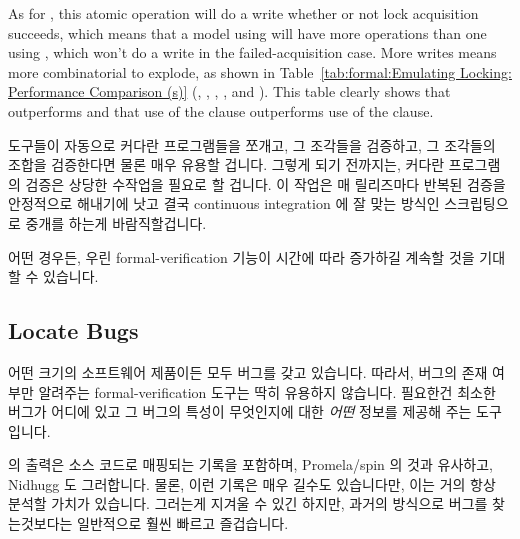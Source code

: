 {	As for , this atomic operation will do a
	write whether or not lock acquisition succeeds, which means
	that a model using  will have more operations
	than one using , which won't do a write
	in the failed-acquisition case.
	More writes means more combinatorial to explode, as shown in
	Table~\ref{tab:formal:Emulating Locking: Performance Comparison (s)}
	(,
	,
	,
	, and
	).
	This table clearly shows that 
	outperforms  and that use of the
	 clause outperforms use of the  clause.
	\fi
} \QuickQuizEnd

도구들이 자동으로 커다란 프로그램들을 쪼개고, 그 조각들을 검증하고, 그 조각들의
조합을 검증한다면 물론 매우 유용할 겁니다.
그렇게 되기 전까지는, 커다란 프로그램의 검증은 상당한 수작업을 필요로 할
겁니다.
이 작업은 매 릴리즈마다 반복된 검증을 안정적으로 해내기에 낫고 결국 continuous
integration 에 잘 맞는 방식인 스크립팅으로 중개를 하는게 바람직할겁니다.

어떤 경우든, 우린 formal-verification 기능이 시간에 따라 증가하길 계속할 것을
기대할 수 있습니다.
\iffalse

It would of course be quite useful for tools to automatically divide
up large programs, verify the pieces, and then verify the combinations
of pieces.
In the meantime, verification of large programs will require significant
manual intervention.
This intervention will preferably mediated by scripting, the better to
reliably carry out repeated verifications on each release, and
preferably eventually in a manner well-suited for continuous integration.

In any case, we can expect formal-verification capabilities to continue
to increase over time.
\fi

\subsection{Locate Bugs}
\label{sec:formal:Locate Bugs}

어떤 크기의 소프트웨어 제품이든 모두 버그를 갖고 있습니다.
따라서, 버그의 존재 여부만 알려주는 formal-verification 도구는 딱히 유용하지
않습니다.
필요한건 최소한 버그가 어디에 있고 그 버그의 특성이 무엇인지에 대한 \emph{어떤}
정보를 제공해 주는 도구입니다.

 의 출력은 소스 코드로 매핑되는 기록을 포함하며, Promela/spin 의 것과
유사하고, Nidhugg 도 그러합니다.
물론, 이런 기록은 매우 길수도 있습니다만, 이는 거의 항상 분석할 가치가
있습니다.
그러는게 지겨울 수 있긴 하지만, 과거의 방식으로 버그를 찾는것보다는 일반적으로
훨씬 빠르고 즐겁습니다.
\iffalse

